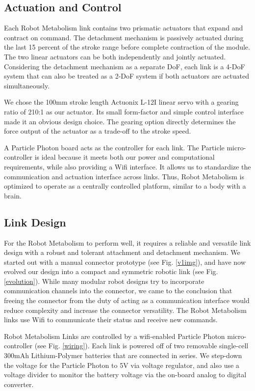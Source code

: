 \documentclass[letterpaper, 10 pt, conference]{ieeeconf}  %
\begin{document}
\subsection{Actuation and Control}

Each Robot Metabolism link contains two prismatic actuators that expand and contract on command. The detachment mechanism is passively actuated during the last 15 percent of the stroke range before complete contraction of the module. The two linear actuators can be both independently and jointly actuated. Considering the detachment mechanism as a separate DoF, each link is a 4-DoF system that can also be treated as a 2-DoF system if both actuators are actuated simultaneously.

We chose the 100mm stroke length Actuonix L-12I linear servo with a gearing ratio of 210:1 as our actuator. Its small form-factor and simple control interface made it an obvious design choice. The gearing option directly determines the force output of the actuator as a trade-off to the stroke speed.

A Particle Photon board acts as the controller for each link. The Particle micro-controller is ideal because it meets both our power and computational requirements, while also providing a Wifi interface. It allows us to standardize the communication and actuation interface across links. Thus, Robot Metabolism is optimized to operate as a centrally controlled platform, similar to a body with a brain.

\subsection{Link Design}
For the Robot Metabolism to perform well, it requires a reliable and versatile link design with a robust and tolerant attachment and detachment mechanism. We started out with a manual connector prototype (see Fig. \ref{v1img}), and have now evolved our design into a compact and symmetric robotic link (see Fig. \ref{evolution}). While many modular robot designs try to incorporate communication channels into the connector, we came to the conclusion that freeing the connector from the duty of acting as a communication interface would reduce complexity and increase the connector versatility. The Robot Metabolism links use Wifi to communicate their status and receive new commands.

Robot Metabolism Links are controlled by a wifi-enabled Particle Photon micro-controller (see Fig. \ref{wiring}). Each link is powered off of two removable single-cell 300mAh Lithium-Polymer batteries that are connected in series. We step-down the voltage for the Particle Photon to 5V via voltage regulator, and also use a voltage divider to monitor the battery voltage via the on-board analog to digital converter.
\end{document}
